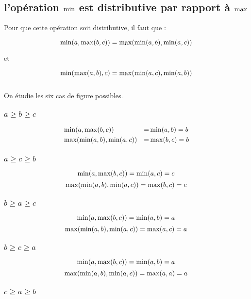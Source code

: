 \documentclass{article}
\begin{document}
\subsection{l'opération $\mmin$ est distributive par rapport à $\mmax$}

Pour que cette opération soit distributive, il faut que :

$$\mmin(a, \mmax(b,c)) = \mmax(\mmin(a,b),\mmin(a,c))$$
\begin{center}et\end{center}
$$\mmin(\mmax(a,b),c) = \mmax(\mmin(a,c),\mmin(a,b))$$\\

On étudie les six cas de figure possibles.

\subsubsection{$a \geq b \geq c$}

\begin{align*}
  &\mmin(a, \mmax(b, c)) &= &\mmin(a, b) = b\\
  &\mmax(\mmin(a, b),\mmin(a,c)) &= &\mmax(b,c) = b
\end{align*}

\subsubsection{$a \geq c \geq b$}

$$\mmin(a, \mmax(b, c)) = \mmin(a, c) = c$$
$$\mmax(\mmin(a, b),\mmin(a,c)) = \mmax(b,c) = c$$

\subsubsection{$b \geq a \geq c$}

$$\mmin(a, \mmax(b, c)) = \mmin(a, b) = a$$
$$\mmax(\mmin(a, b),\mmin(a,c)) = \mmax(a,c) = a$$

\subsubsection{$b \geq c \geq a$}

$$\mmin(a, \mmax(b, c)) = \mmin(a, b) = a$$
$$\mmax(\mmin(a, b),\mmin(a,c)) = \mmax(a,a) = a$$

\subsubsection{$c \geq a \geq b$}
\end{document}
